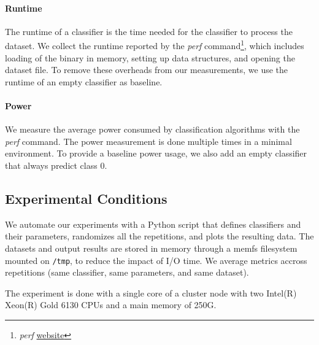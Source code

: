 \paragraph{Runtime}
The runtime of a classifier is the time needed for
the classifier to process the dataset. We
collect the runtime reported by the \textit{perf}
command\footnote{\textit{perf}
\href{https://perf.wiki.kernel.org/index.php/Main_Page}{website}}, which
includes loading of the binary in memory, setting up data structures, and
opening the dataset file. To remove these overheads from our measurements,
we use the runtime of an empty classifier as baseline.

\paragraph{Power} We measure the average power
consumed by classification algorithms with the
\textit{perf} command. The power measurement is
done multiple times in a minimal environment. To
provide a baseline power usage, we also add an
empty classifier that always predict class 0.

\subsection{Experimental Conditions}
We automate our experiments with a Python script that defines
classifiers and their parameters, randomizes all
the repetitions, and plots the
resulting data. The datasets and output results are stored in memory
through a memfs filesystem mounted on \texttt{/tmp}, to reduce the impact of I/O time.
We average metrics accross repetitions (same classifier, same parameters, and
same dataset).

The experiment is done with a single core of a
cluster node with two Intel(R) Xeon(R)
Gold 6130 CPUs and a main memory of 250G.

